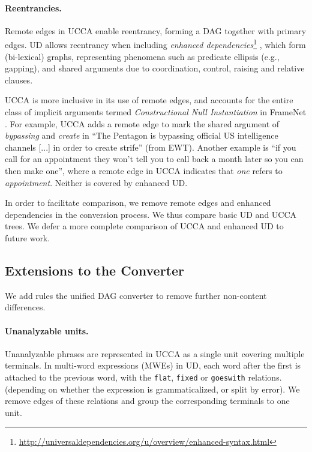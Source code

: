 \documentclass[11pt,a4paper]{article}
\begin{document}
\paragraph{Reentrancies.}
Remote edges in UCCA enable reentrancy, forming a DAG together with primary edges.
UD allows reentrancy when including \textit{enhanced dependencies}\footnote{\url{http://universaldependencies.org/u/overview/enhanced-syntax.html}}
\cite{SCHUSTER16.779}, which form (bi-lexical) graphs, representing phenomena
such as predicate ellipsis (e.g., gapping),
and shared arguments due to coordination, control, raising and relative clauses.

UCCA is more inclusive in its use of remote edges, and accounts for 
the entire class of implicit arguments termed {\it Constructional Null Instantiation} in FrameNet \citep{Ruppenhofer:16}.
For example, UCCA adds a remote edge to mark the shared argument of \textit{bypassing} and
\textit{create} in ``The Pentagon is bypassing official US intelligence channels [...] in order to create strife'' (from EWT). 
Another example is ``if you call for an appointment they won't tell you to call back a month later so you can then make one'',
where a remote edge in UCCA indicates that \textit{one} refers to \textit{appointment}.
Neither is covered by enhanced UD.

In order to facilitate comparison, we remove remote edges and enhanced dependencies in the conversion process.
We thus compare basic UD and UCCA trees. We defer a more complete comparison of UCCA and enhanced UD to future work.



\subsection{Extensions to the Converter}\label{sec:local}

We add rules the unified DAG converter to remove further non-content differences.

\paragraph{Unanalyzable units.}
Unanalyzable phrases are represented in UCCA as a single unit covering multiple terminals.
In multi-word expressions (MWEs) in UD, each word after the first is attached to the previous word,
with the \texttt{flat}, \texttt{fixed} or \texttt{goeswith} relations.
(depending on whether the expression is grammaticalized, or split by error).
We remove edges of these relations and group the corresponding terminals to one unit.
\end{document}
